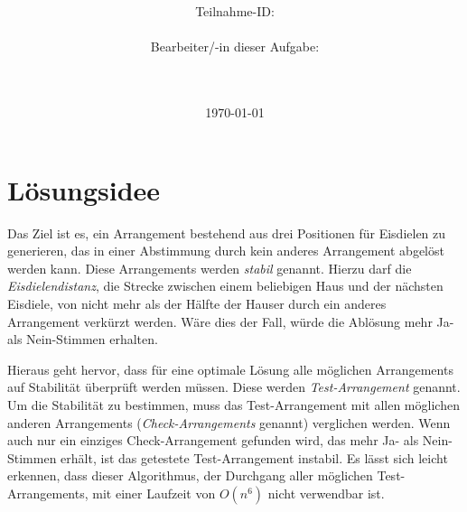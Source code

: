 \documentclass[a4paper,10pt,ngerman,captions=figureheading]{scrartcl}
\title{\textbf{\Huge\Aufgabe}}
\author{\LARGE Teilnahme-ID: \LARGE \TeilnahmeId \\\\
	    \LARGE Bearbeiter/-in dieser Aufgabe: \\ 
	    \LARGE \Name\\\\}
\date{\LARGE\today}
\begin{document}
\maketitle
\tableofcontents

\vspace{0.5cm}

\section{Lösungsidee}
Das Ziel ist es, ein Arrangement bestehend aus drei Positionen für Eisdielen zu generieren, das in einer Abstimmung durch kein anderes Arrangement abgelöst werden kann.
Diese Arrangements werden \emph{stabil} genannt.
Hierzu darf die \emph{Eisdielendistanz}, die Strecke zwischen einem beliebigen Haus und der nächsten Eisdiele, von nicht mehr als der Hälfte der Hauser durch ein anderes Arrangement verkürzt werden.
Wäre dies der Fall, würde die Ablösung mehr Ja- als Nein-Stimmen erhalten.

Hieraus geht hervor, dass für eine optimale Lösung alle möglichen Arrangements auf Stabilität überprüft werden müssen.
Diese werden \emph{Test-Arrangement} genannt.
Um die Stabilität zu bestimmen, muss das Test-Arrangement mit allen möglichen anderen Arrangements (\emph{Check-Arrangements} genannt) verglichen werden.
Wenn auch nur ein einziges Check-Arrangement gefunden wird, das mehr Ja- als Nein-Stimmen erhält, ist das getestete Test-Arrangement instabil.
Es lässt sich leicht erkennen, dass dieser Algorithmus, der Durchgang aller möglichen Test-Arrangements, mit einer Laufzeit von $O(n^6)$ nicht verwendbar ist.
\end{document}
